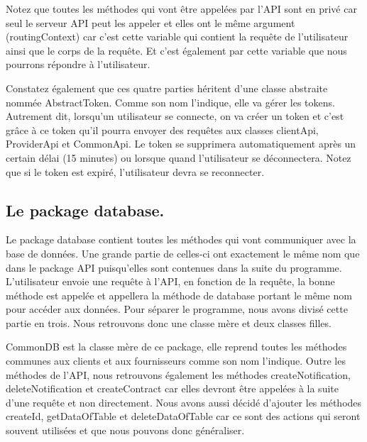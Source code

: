 \begin{flushleft}
Notez que toutes les méthodes qui vont être appelées par l'API sont en privé car seul le serveur API peut les appeler et elles ont  le même argument (routingContext) car c'est cette variable qui contient la requête de l'utilisateur ainsi que le corps de la requête. Et c'est également par cette variable que nous pourrons répondre à l'utilisateur.
\end{flushleft}

\begin{flushleft}
Constatez également que ces quatre parties héritent d'une classe abstraite nommée AbstractToken. Comme son nom l'indique, elle va gérer les tokens. Autrement dit, lorsqu'un utilisateur se connecte, on va créer un token et c'est grâce à ce token qu'il pourra envoyer des requêtes aux classes clientApi, ProviderApi et CommonApi. Le token se supprimera automatiquement après un certain délai (15 minutes) ou lorsque quand l'utilisateur se déconnectera.
\newline
Notez que si le token est expiré, l'utilisateur devra se reconnecter.
\end{flushleft}

\subsection{Le package database.}

\begin{flushleft}
Le package database contient toutes les méthodes qui vont communiquer avec la base de données. Une grande partie de celles-ci ont exactement le même nom que dans le package API puisqu’elles sont contenues dans la suite du programme. L'utilisateur envoie une requête à l'API, en fonction de la requête, la bonne méthode est appelée et appellera la méthode de database portant le même nom pour accéder aux données. Pour séparer le programme, nous avons divisé  cette partie en trois. Nous retrouvons donc une classe mère et deux classes filles.
\end{flushleft}

\begin{flushleft}
CommonDB est la classe mère de ce package, elle reprend toutes les méthodes communes aux clients et aux fournisseurs comme son nom l'indique. Outre les méthodes de l'API, nous retrouvons également les méthodes createNotification, deleteNotification et createContract car elles devront être appelées à la suite d'une requête et non directement. Nous avons aussi décidé d'ajouter les méthodes createId, getDataOfTable et deleteDataOfTable car ce sont des actions qui seront souvent utilisées et que nous pouvons donc généraliser.
\end{flushleft}

